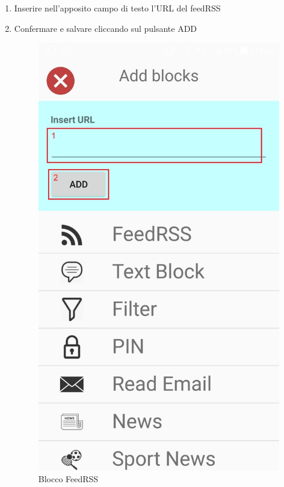 \begin{enumerate}
	\item Inserire nell'apposito campo di testo l'URL del feedRSS
	\item Confermare e salvare cliccando sul pulsante ADD
\begin{figure}[!ht]
	\centering
	\includegraphics[scale=0.2]{images/BlockFeedRSS.jpg}
	\caption{Blocco FeedRSS}
\end{figure}
\end{enumerate}

